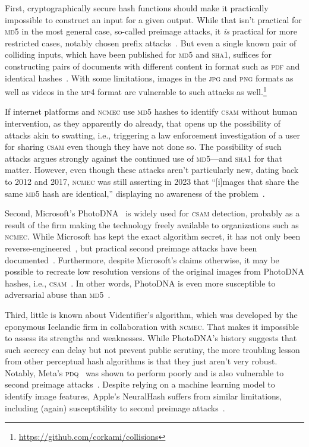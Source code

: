 \documentclass[nonacm,screen]{acmart}
\newcommand\V[1]{\textsc{\MakeLowercase{#1}}}
\begin{document}
First, cryptographically secure hash functions should make it practically
impossible to construct an input for a given output. While that isn't practical
for \V{MD5} in the most general case, so-called preimage attacks, it \emph{is}
practical for more restricted cases, notably chosen prefix
attacks~\cite{StevensLenstraea2012}. But even a single known pair of colliding
inputs, which have been published for \V{MD5} and \V{SHA1}, suffices for
constructing pairs of documents with different content in format such as \V{PDF}
and identical hashes~\cite{LeurentPeyrin2020,StevensBurszteinea2017}. With some
limitations, images in the \V{JPG} and \V{PNG} formats as well as videos in the
\V{MP4} format are vulnerable to such attacks as
well.\footnote{\url{https://github.com/corkami/collisions}}

If internet platforms and \V{NCMEC} use \V{MD5} hashes to identify \V{CSAM}
without human intervention, as they apparently do already, that opens up the
possibility of attacks akin to swatting, i.e., triggering a law enforcement
investigation of a user for sharing \V{CSAM} even though they have not done so.
The possibility of such attacks argues strongly against the continued use of
\V{MD5}---and \V{SHA1} for that matter. However, even though these attacks
aren't particularly new, dating back to 2012 and 2017, \V{NCMEC} was still
asserting in 2023 that ``[i]mages that share the same \V{MD5} hash are
identical,'' displaying no awareness of the problem~\cite{NCMEC2024}.

Second, Microsoft's PhotoDNA~\cite{Farid2018} is widely used for \V{CSAM}
detection, probably as a result of the firm making the technology freely
available to organizations such as \V{NCMEC}. While Microsoft has kept the exact
algorithm secret, it has not only been reverse-engineered~\cite{Krawetz2021a},
but practical second preimage attacks have been
documented~\cite{ProkosJoisea2021}. Furthermore, despite Microsoft's claims
otherwise, it may be possible to recreate low resolution versions of the
original images from PhotoDNA hashes, i.e., \V{CSAM}~\cite{Athalye2021}. In
other words, PhotoDNA is even more susceptible to adversarial abuse than
\V{MD5}~\cite{Steinebach2023}.

Third, little is known about Videntifier's algorithm, which was developed by the
eponymous Icelandic firm in collaboration with \V{NCMEC}. That makes it
impossible to assess its strengths and weaknesses. While PhotoDNA's history
suggests that such secrecy can delay but not prevent public scrutiny, the more
troubling lesson from other perceptual hash algorithms is that they just aren't
very robust. Notably, Meta's \V{PDQ}~\cite{DavisRosen2019} was shown to perform
poorly and is also vulnerable to second preimage
attacks~\cite{Krawetz2022,ProkosJoisea2021}. Despite relying on a machine
learning model to identify image features, Apple's NeuralHash suffers from
similar limitations, including (again) susceptibility to second preimage
attacks~\cite{StruppekHintersdorfea2022}.
\end{document}
